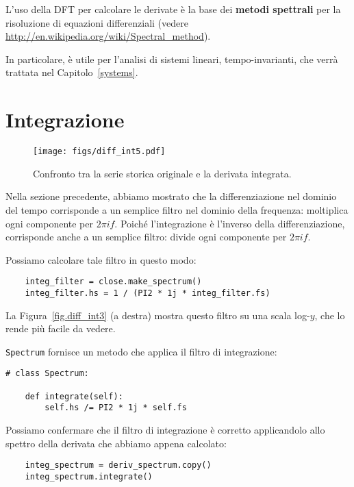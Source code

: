 \documentclass[12pt,a4paper]{book}
\begin{document}
L'uso della DFT per calcolare le derivate è la base dei {\bf metodi spettrali} per la risoluzione di equazioni differenziali (vedere \url{http://en.wikipedia.org/wiki/Spectral_method}).

In particolare, è utile per l'analisi di sistemi lineari, tempo-invarianti, che verrà trattata nel Capitolo~\ref{systems}.

\section{Integrazione} 

\begin{figure} 

\centerline{\texttt{[image: figs/diff\_int5.pdf]}} \caption{Confronto tra la serie storica originale e la derivata integrata.} \label{fig.diff_int5} \end{figure} 

Nella sezione precedente, abbiamo mostrato che la differenziazione nel dominio del tempo corrisponde a un semplice filtro nel dominio della frequenza: moltiplica ogni componente per $2 \pi i f$. Poiché l'integrazione è l'inverso della differenziazione, corrisponde anche a un semplice filtro: divide ogni componente per $2 \pi i f$.

Possiamo calcolare tale filtro in questo modo:

\begin{verbatim} 
    integ_filter = close.make_spectrum()
    integ_filter.hs = 1 / (PI2 * 1j * integ_filter.fs)
 \end{verbatim} 

La Figura~\ref{fig.diff_int3} (a destra) mostra questo filtro su una scala log-$y$, che lo rende più facile da vedere.

{\tt Spectrum} fornisce un metodo che applica il filtro di integrazione:

\begin{verbatim} 
# class Spectrum:

    def integrate(self):
        self.hs /= PI2 * 1j * self.fs
 \end{verbatim} 

Possiamo confermare che il filtro di integrazione è corretto applicandolo allo spettro della derivata che abbiamo appena calcolato:

\begin{verbatim} 
    integ_spectrum = deriv_spectrum.copy()
    integ_spectrum.integrate()
 \end{verbatim} 
\end{document}
